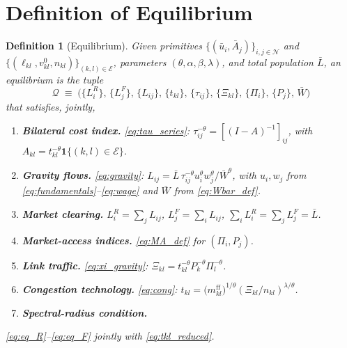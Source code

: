 \documentclass[12pt]{article}
\newtheorem{definition}{Definition}
\newcommand{\N}{\mathcal N}
\newcommand{\E}{\mathcal E}
\newcommand{\Lbar}{\bar L}
\newcommand{\Wbar}{\bar W}
\newcommand{\ubar}{\bar u}
\newcommand{\Abar}{\bar A}
\newcommand{\tbar}{m^{\mathrm{ff}}}
\newcommand{\tkl}{t_{kl}}
\newcommand{\tijk}{\tau_{ij}}
\begin{document}
\section{Definition of Equilibrium}\label{sec:eq}

\begin{definition}[Equilibrium]\label{def:eq}
Given primitives $\{(\ubar_i,\Abar_j)\}_{i,j\in\N}$ and
$\{(\ell_{kl},v^{0}_{kl},n_{kl})\}_{(k,l)\in\E}$, parameters
$(\theta,\alpha,\beta,\lambda)$, and total population $\Lbar$, an
equilibrium is the tuple
\[
  \mathcal Q
  \;\equiv\;
  \bigl(
    \{L_i^R\},\,\{L_j^F\},\,\{L_{ij}\},\,
    \{\tkl\},\,\{\tijk\},\,\{\Xi_{kl}\},\,
    \{\Pi_i\},\,\{P_j\},\,\Wbar
  \bigr)
\]
that satisfies, jointly,
\begin{enumerate}[label=(\textbf{E\arabic*}),leftmargin=3em,itemsep=0.25em]
\item \textbf{Bilateral cost index.} \eqref{eq:tau_series}:
  $\tijk^{-\theta}=[(I-A)^{-1}]_{ij}$, with
  $A_{kl}=\tkl^{-\theta}\mathbf 1\{(k,l)\in\E\}$.
\item \textbf{Gravity flows.} \eqref{eq:gravity}:
  $L_{ij}=\Lbar\,\tijk^{-\theta}u_i^{\theta}w_j^{\theta}/\Wbar^{\theta}$,
  with $u_i,w_j$ from \eqref{eq:fundamentals}--\eqref{eq:wage} and
  $\Wbar$ from \eqref{eq:Wbar_def}.
\item \textbf{Market clearing.} $L_i^R=\sum_j L_{ij}$,
  $L_j^F=\sum_i L_{ij}$, $\sum_i L_i^R=\sum_j L_j^F=\Lbar$.
\item \textbf{Market-access indices.} \eqref{eq:MA_def} for
  $(\Pi_i,P_j)$.
\item \textbf{Link traffic.} \eqref{eq:xi_gravity}:
  $\Xi_{kl}=\tkl^{-\theta}P_k^{-\theta}\Pi_l^{-\theta}$.
\item \textbf{Congestion technology.} \eqref{eq:cong}:
  $\tkl=\bigl(\tbar_{kl}\bigr)^{1/\theta}(\Xi_{kl}/n_{kl})^{\lambda/\theta}$.
\item \textbf{Spectral-radius condition.} 
\end{enumerate}
\eqref{eq:eq_R}--\eqref{eq:eq_F} jointly with
\eqref{eq:tkl_reduced}.
\end{definition}
\end{document}
